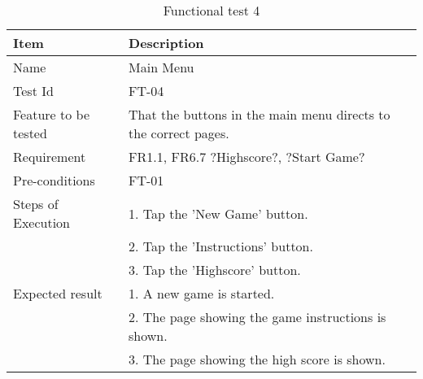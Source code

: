 \begin{table}[H]
\centering
	\begin{tabular}{ l | p{8cm} }
		\hline
		{\bf Item} & {\bf Description} \\ \hline
		Name & Main Menu \\ 
		Test Id & FT-04 \\ 
		Feature to be tested & That the buttons in the main menu directs to the correct pages. \\ 
		Requirement & FR1.1, FR6.7 ?Highscore?, ?Start Game? \\ 
		Pre-conditions & FT-01 \\ 
		Steps of Execution & 1. Tap the 'New Game' button. \\
		& 2. Tap the 'Instructions' button. \\
		& 3. Tap the 'Highscore' button. \\
		Expected result & 1. A new game is started. \\
		& 2. The page showing the game instructions is shown. \\
		& 3. The page showing the high score is shown. \\
	\end{tabular}
	\caption{Functional test 4}
\end{table}

